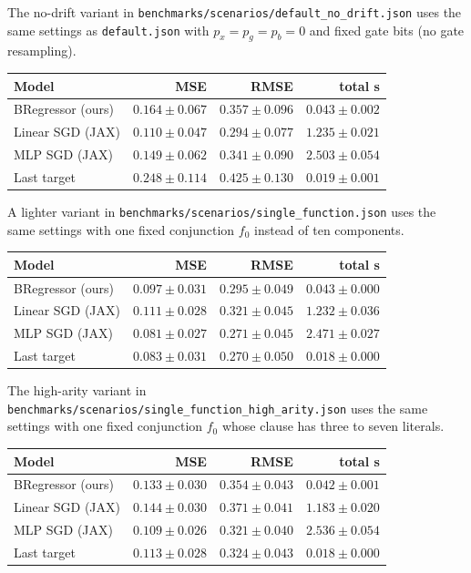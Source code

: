 \documentclass[11pt]{article}
\begin{document}
The no-drift variant in \texttt{benchmarks/scenarios/default\_no\_drift.json}
uses the same settings as \texttt{default.json} with
$p_x=p_g=p_b=0$ and fixed gate bits (no gate resampling).

\begin{center}
\footnotesize
\begin{tabular}{lrrr}
\hline
\textbf{Model} & MSE & RMSE & total s \\
\hline
BRegressor (ours) & $0.164\pm0.067$ & $0.357\pm0.096$ & $0.043\pm0.002$ \\
Linear SGD (JAX) & $0.110\pm0.047$ & $0.294\pm0.077$ & $1.235\pm0.021$ \\
MLP SGD (JAX) & $0.149\pm0.062$ & $0.341\pm0.090$ & $2.503\pm0.054$ \\
Last target & $0.248\pm0.114$ & $0.425\pm0.130$ & $0.019\pm0.001$ \\
\hline
\end{tabular}
\end{center}

A lighter variant in \texttt{benchmarks/scenarios/single\_function.json}
uses the same settings with one fixed conjunction $f_0$ instead of ten
components.

\begin{center}
\footnotesize
\begin{tabular}{lrrr}
\hline
\textbf{Model} & MSE & RMSE & total s \\
\hline
BRegressor (ours) & $0.097\pm0.031$ & $0.295\pm0.049$ & $0.043\pm0.000$ \\
Linear SGD (JAX) & $0.111\pm0.028$ & $0.321\pm0.045$ & $1.232\pm0.036$ \\
MLP SGD (JAX) & $0.081\pm0.027$ & $0.271\pm0.045$ & $2.471\pm0.027$ \\
Last target & $0.083\pm0.031$ & $0.270\pm0.050$ & $0.018\pm0.000$ \\
\hline
\end{tabular}
\end{center}

The high-arity variant in \texttt{benchmarks/scenarios/single\_function\_high\_arity.json}
uses the same settings with one fixed conjunction $f_0$ whose clause has three to
seven literals.

\begin{center}
\footnotesize
\begin{tabular}{lrrr}
\hline
\textbf{Model} & MSE & RMSE & total s \\
\hline
BRegressor (ours) & $0.133\pm0.030$ & $0.354\pm0.043$ & $0.042\pm0.001$ \\
Linear SGD (JAX) & $0.144\pm0.030$ & $0.371\pm0.041$ & $1.183\pm0.020$ \\
MLP SGD (JAX) & $0.109\pm0.026$ & $0.321\pm0.040$ & $2.536\pm0.054$ \\
Last target & $0.113\pm0.028$ & $0.324\pm0.043$ & $0.018\pm0.000$ \\
\hline
\end{tabular}
\end{center}
\end{document}
